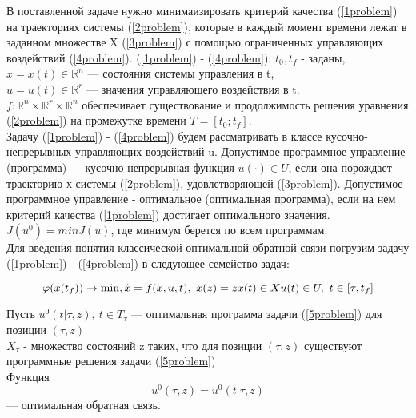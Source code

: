 В поставленной задаче нужно минимаизировать критерий качества (\ref{1problem}) на траекториях системы (\ref{2problem}), которые в каждый момент времени лежат в заданном множестве X (\ref{3problem}) с помощью ограниченных управляющих воздействий (\ref{4problem}).
(\ref{1problem}) - (\ref{4problem}):  $t_0, t_f$ - заданы,\\
$x = x(t)\in\mathbb{R}^n$ --- состояния системы управления в t,\\
$u = u(t)\in\mathbb{R}^r$ --- значения управляющего воздействия в t.\\
$f:\mathbb{R}^n\times\mathbb{R}^r\times\mathbb{R}^n$ обеспечивает существование и продолжимость решения уравнения (\ref{2problem}) на промежутке времени $T = [t_0; t_f]$. \\

Задачу (\ref{1problem}) - (\ref{4problem}) будем рассматривать в классе кусочно-непрерывных управляющих воздействий u.
Допустимое программное управление (программа) --- кусочно-непрерывная функция $u(\cdot)\in U$,
если она порождает траекторию х системы (\ref{2problem}), удовлетворяющей (\ref{3problem}). Допустимое программное управление - оптимальное (оптимальная программа), если на нем критерий качества (\ref{1problem}) достигает оптимального значения.
$J(u^0) = min J(u)$, где минимум берется по всем программам.\\
Для введения понятия классической оптимальной обратной связи погрузим задачу (\ref{1problem}) - (\ref{4problem}) в следующее семейство задач:

\begin{equation} \label{5problem}
    \varphi(x(t_f))\to \min,
    \dot{x}=f(x,u,t),\ x(z)=z
  	x(t)\in X\\
  	 u(t)\in U,\  t\in [\tau, t_f]
     \end{equation}

Пусть $u^0(t|\tau,z),\ t\in T_\tau$ --- оптимальная программа задачи (\ref{5problem}) для позиции $(\tau,z)$ \\
$X_\tau$ - множество состояний z таких, что для позиции $(\tau,z)$ существуют программные решения задачи (\ref{5problem}) \\
Функция
\begin{equation} \label{6problem}
    u^0(\tau,z) = u^0(t|\tau,z)
     \end{equation}
     --- оптимальная обратная связь.\\

